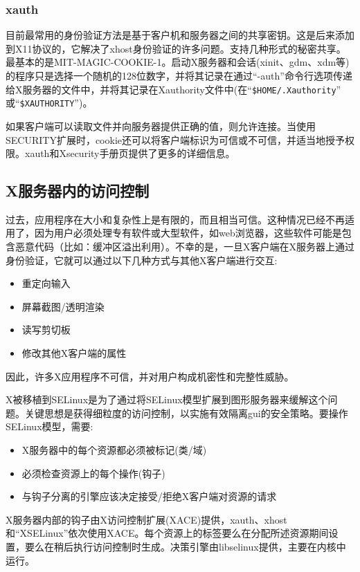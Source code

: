 \subsubsection{xauth}

目前最常用的身份验证方法是基于客户机和服务器之间的共享密钥。这是后来添加到X11协议的，它解决了xhost身份验证的许多问题。支持几种形式的秘密共享。最基本的是MIT-MAGIC-COOKIE-1。启动X服务器和会话(xinit、gdm、xdm等)的程序只是选择一个随机的128位数字，并将其记录在通过“-auth”命令行选项传递给X服务器的文件中，并将其记录在Xauthority文件中(在“\lstinline|$HOME/.Xauthority|”
或“\lstinline|$XAUTHORITY|”)。

如果客户端可以读取文件并向服务器提供正确的值，则允许连接。当使用SECURITY扩展时，cookie还可以将客户端标识为可信或不可信，并适当地授予权限。xauth和Xsecurity手册页提供了更多的详细信息。

\subsection{X服务器内的访问控制}

过去，应用程序在大小和复杂性上是有限的，而且相当可信。这种情况已经不再适用了，因为用户必须处理专有软件或大型软件，如web浏览器，这些软件可能是包含恶意代码（比如：缓冲区溢出利用）。不幸的是，一旦X客户端在X服务器上通过身份验证，它就可以通过以下几种方式与其他X客户端进行交互:

\begin{itemize}
	\item 重定向输入
	\item 屏幕截图/透明渲染
	\item 读写剪切板
	\item 修改其他X客户端的属性
\end{itemize}

\noindent 因此，许多X应用程序不可信，并对用户构成机密性和完整性威胁。

X被移植到SELinux是为了通过将SELinux模型扩展到图形服务器来缓解这个问题。关键思想是获得细粒度的访问控制，以实施有效隔离gui的安全策略。要操作SELinux模型，需要:

\begin{itemize}
	\item X服务器中的每个资源都必须被标记(类/域)
	\item 必须检查资源上的每个操作(钩子)
	\item 与钩子分离的引擎应该决定接受/拒绝X客户端对资源的请求
\end{itemize}

X服务器内部的钩子由X访问控制扩展(XACE)提供，xauth、xhost和“XSELinux”依次使用XACE。每个资源上的标签要么在分配所述资源期间设置，要么在稍后执行访问控制时生成。决策引擎由libselinux提供，主要在内核中运行。

